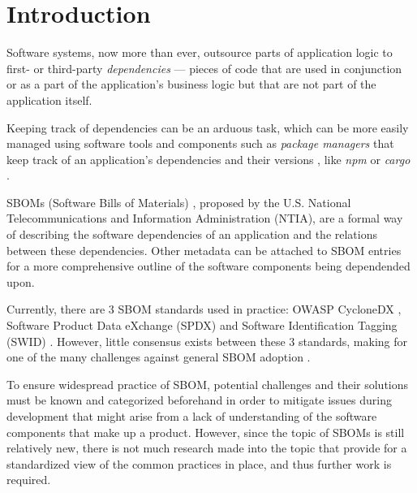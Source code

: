 \section{Introduction}

Software systems, now more than ever, outsource parts of application logic to first- or third-party \emph{dependencies} --- pieces of code that are used in conjunction or as a part of the application's business logic but that are not part of the application itself.

\noindent Keeping track of dependencies can be an arduous task, which can be more easily managed using software tools and components such as \emph{package managers} that keep track of an application's dependencies and their versions \cite{article:package-manager}, like \emph{npm} or \emph{cargo} \cite{tools:pkg-mngr:npm,tools:pkg-mngr:cargo}.

\noindent SBOMs (Software Bills of Materials) \cite{article:concept:sbom-2}, proposed by the U.S. National Telecommunications and Information Administration (NTIA), are a formal way of describing the software dependencies of an application and the relations between these dependencies. Other metadata can be attached to SBOM entries for a more comprehensive outline of the software components being dependended upon.

\noindent Currently, there are 3 SBOM standards used in practice: OWASP CycloneDX \cite{standards:sbom:cyclonedx}, Software Product Data eXchange (SPDX) \cite{standards:sbom:spdx} and Software Identification Tagging (SWID) \cite{standards:sbom:swid}. However, little consensus exists between these 3 standards, making for one of the many challenges against general SBOM adoption \cite{article:sbom-study}.

\noindent To ensure widespread practice of SBOM, potential challenges and their solutions must be known and categorized beforehand in order to mitigate issues during development that might arise from a lack of understanding of the software components that make up a product. However, since the topic of SBOMs is still relatively new, there is not much research made into the topic that provide for a standardized view of the common practices in place, and thus further work is required.

